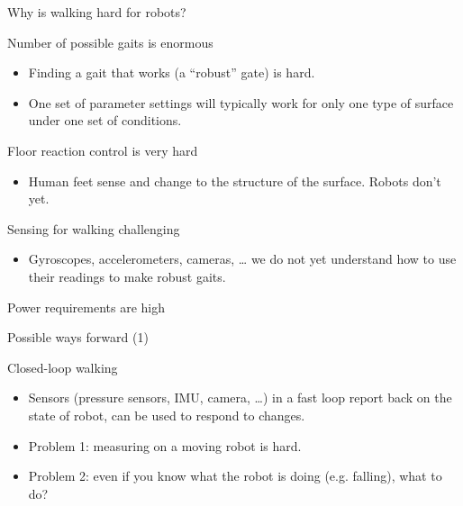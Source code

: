 \documentclass[compress]{beamer}
\begin{document}
\begin{frame}{Why is walking hard for robots?}

    Number of possible gaits is enormous

    \begin{itemize}

        \item Finding a gait that works (a ``robust'' gate) is hard.
        \item One set of parameter settings will typically work for only one type of
            surface under one set of conditions.
    \end{itemize}

    Floor reaction control is very hard

    \begin{itemize}

        \item Human feet sense and change to the structure of the surface. Robots
            don't yet.
    \end{itemize}

    Sensing for walking challenging

    \begin{itemize}

        \item Gyroscopes, accelerometers, cameras, \ldots{} we do not yet understand
            how to use their readings to make robust gaits.
    \end{itemize}

    Power requirements are high

\end{frame}

\begin{frame}{Possible ways forward (1)}

    Closed-loop walking

    \begin{itemize}

        \item Sensors (pressure sensors, IMU, camera, \ldots{}) in a fast loop
            report back on the state of robot, can be used to respond to changes.
        \item Problem 1: measuring on a moving robot is hard.
        \item Problem 2: even if you know what the robot is doing (e.g. falling),
            what to do?
    \end{itemize}

\end{frame}
\end{document}
